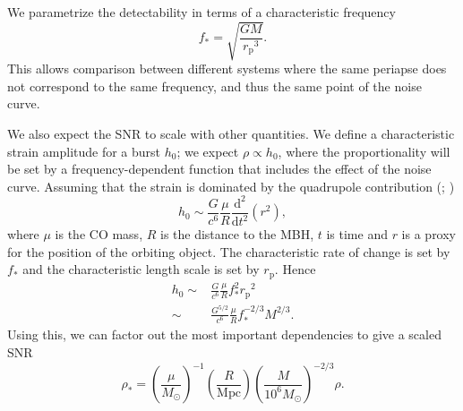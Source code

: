 \documentclass[useAMS,usedcolumn,usegraphicx,usenatbib]{mn2e}
\newcommand{\sub}[1]{\ensuremath{_\mathrm{#1}}}
\newcommand{\dd}{\ensuremath{\mathrm{d}}}
\begin{document}
We parametrize the detectability in terms of a characteristic frequency
\begin{equation}
f_\ast = \sqrt{\frac{GM}{r\sub{p}^3}}.
\end{equation}
This allows comparison between different systems where the same periapse does not correspond to the same frequency, and thus the same point of the noise curve.

We also expect the SNR to scale with other quantities. We define a characteristic strain amplitude for a burst $h_0$; we expect $\rho \propto h_0$, where the proportionality will be set by a frequency-dependent function that includes the effect of the noise curve. Assuming that the strain is dominated by the quadrupole contribution (\citealt*[section 36.10]{Misner1973}; \citealt*[section 17.9]{Hobson2006})
\begin{equation}
h_0 \sim \frac{G}{c^6}\frac{\mu}{R}\frac{\dd^2}{\dd t^2}\left(r^2\right),
\end{equation}
where $\mu$ is the CO mass, $R$ is the distance to the MBH, $t$ is time and $r$ is a proxy for the position of the orbiting object. The characteristic rate of change is set by $f_\ast$ and the characteristic length scale is set by $r\sub{p}$. Hence
\begin{align}
h_0 \sim {} & \frac{G}{c^6}\frac{\mu}{R}f_\ast^2 r\sub{p}^2 \\
 \sim {} & \frac{G^{5/2}}{c^6}\frac{\mu}{R}f_\ast^{-2/3}M^{2/3}.
\end{align}
Using this, we can factor out the most important dependencies to give a scaled SNR
\begin{equation}
\rho_\ast = \left(\frac{\mu}{M_\odot}\right)^{-1}\left(\frac{R}{\mathrm{Mpc}}\right)\left(\frac{M}{10^6 M_\odot}\right)^{-2/3}\rho.
\label{eq:SNR-scaling}
\end{equation}
\end{document}
